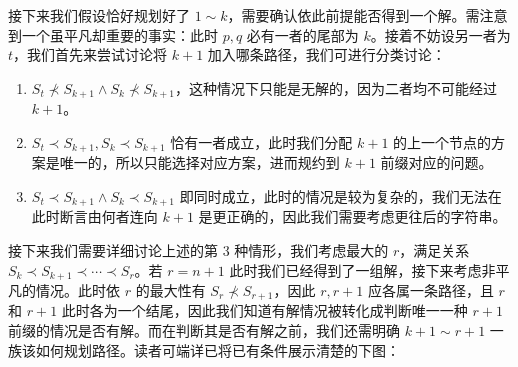 \documentclass[12pt]{ctexart}
\begin{document}
接下来我们假设恰好规划好了 $1\sim k$，需要确认依此前提能否得到一个解。需注意到一个虽平凡却重要的事实：此时 $p,q$ 必有一者的尾部为 $k$。接着不妨设另一者为 $t$，我们首先来尝试讨论将 $k+1$ 加入哪条路径，我们可进行分类讨论：

\begin{enumerate}
\item $S_t \nprec S_{k+1} \wedge S_k \nprec S_{k+1}$，这种情况下只能是无解的，因为二者均不可能经过 $k+1$。
\item $S_t \prec S_{k+1}, S_k \prec S_{k+1}$ 恰有一者成立，此时我们分配 $k+1$ 的上一个节点的方案是唯一的，所以只能选择对应方案，进而规约到 $k+1$ 前缀对应的问题。
\item $S_t \prec S_{k+1} \wedge S_k\prec S_{k+1}$ 即同时成立，此时的情况是较为复杂的，我们无法在此时断言由何者连向 $k+1$ 是更正确的，因此我们需要考虑更往后的字符串。
\end{enumerate}

接下来我们需要详细讨论上述的第 3 种情形，我们考虑最大的 $r$，满足关系 $S_k \prec S_{k+1}\prec \cdots \prec S_r$。若 $r=n+1$ 此时我们已经得到了一组解，接下来考虑非平凡的情况。此时依 $r$ 的最大性有 $S_r \nprec S_{r+1}$，因此 $r,r+1$ 应各属一条路径，且 $r$ 和 $r+1$ 此时各为一个结尾，因此我们知道有解情况被转化成判断唯一一种 $r+1$ 前缀的情况是否有解。而在判断其是否有解之前，我们还需明确 $k+1 \sim r+1$ 一族该如何规划路径。读者可端详已将已有条件展示清楚的下图：

\begin{center}
\end{center}
\end{document}

